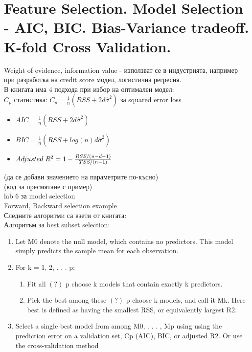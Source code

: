 \documentclass{article}
\begin{document}
	
	
	
	\newpage
	\section{Feature Selection. Model Selection - AIC, BIC. Bias-Variance tradeoff. K-fold Cross Validation.} 
	Weight of evidence, information value - използват се в индустрията, например при разработка на credit score модел, логистична регресия. \\
	В книгата има 4 подхода при избор на оптимален модел: \\
	$C_p$ статистика: $C_p = \frac{1}{n}(RSS + 2d \hat \sigma^2)$ за squared error loss
	\begin{itemize}
		\item $AIC = \frac{1}{n}(RSS + 2d \hat \sigma^2)$
		\item $BIC = \frac{1}{n}(RSS + log(n) d \hat \sigma^2)$
		\item $Adjusted \hspace{0.1cm} R^2 = 1 - \frac{RSS/(n-d-1)}{TSS/(n-1)} $
	\end{itemize}
	(да се добави значението на параметрите по-късно) \\
	(код за пресмятане с пример) \\
	

	lab 6 за model selection \\
	Forward, Backward selection example \\
	Следните алгоритми са взети от книгата: \\
	Алгоритъм за best subset selection: 
	\begin{enumerate}
		\item Let M0 denote the null model, which contains no predictors. This
		model simply predicts the sample mean for each observation.
		\item For k = 1, 2, . . . p: 
			\begin{enumerate}
				\item Fit all $(?)$ p choose k models that contain exactly k predictors.
				\item Pick the best among these  $(?)$ p choose k models, and call it Mk. Here best
				is defined as having the smallest RSS, or equivalently largest R2.
			\end{enumerate}
		\item Select a single best model from among M0, . . . , Mp using using the
		prediction error on a validation set, Cp (AIC), BIC, or adjusted R2.
		Or use the cross-validation method
	\end{enumerate}
	
\end{document}
